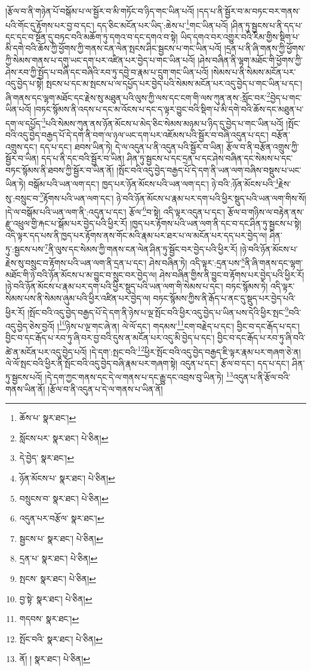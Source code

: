 །རྩོལ་བ་ནི་གཉེན་པོ་བསྒོམ་པ་ལ་སྦྱོར་བ་མི་གཏོང་བ་ཉིད་གང་ཡིན་པའོ། །དད་པ་ནི་སྦྱོར་བ་མ་བཏང་བར་གནས་པའི་གོང་དུ་རྟོགས་པར་བྱ་བ་དང་། དད་ཅིང་མངོན་པར་ཡིད་:ཆེས་པ་\footnote{ཆོས་པ་  སྣར་ཐང་། }གང་ཡིན་པའོ། །ཤིན་ཏུ་སྦྱངས་པ་ནི་དད་པ་དང་དང་བ་སྔོན་དུ་བཏང་བའི་མཆོག་ཏུ་དགའ་བ་དང་དགའ་བ་སྟེ། ཡིད་དགའ་བར་འགྱུར་བའི་རིམ་གྱིས་སྡིག་པ་མི་དགེ་བའི་ཆོས་ཀྱི་ཕྱོགས་ཀྱི་གནས་ངན་ལེན་སྤངས་ཤིང་སྦྱངས་པ་གང་ཡིན་པའོ། །དྲན་པ་ནི་ཞི་གནས་ཀྱི་ཕྱོགས་ཀྱི་སེམས་གནས་པ་དགུ་ཡང་དག་པར་འཛིན་པར་བྱེད་པ་གང་ཡིན་པའོ། །ཤེས་བཞིན་ནི་ལྷག་མཐོང་གི་ཕྱོགས་ཀྱི་ཤེས་རབ་ཀྱི་སྤྱོད་པ་བཞི་དང་བཞིའི་རབ་ཏུ་དབྱེ་བ་རྣམ་པ་དྲུག་གང་ཡིན་པའོ། །སེམས་པ་ནི་སེམས་མངོན་པར་འདུ་བྱེད་པ་སྟེ། སྤངས་པ་དང་མ་སྤངས་པ་ལ་དཔྱོད་པར་བྱེད་པའི་སེམས་མངོན་པར་འདུ་བྱེད་པ་གང་ཡིན་པ་དང་། ཞི་གནས་དང་ལྷག་མཐོང་དང་རྗེས་སུ་མཐུན་པའི་ལུས་ཀྱི་ལས་དང་ངག་གི་ལས་ཀུན་ནས་:སློང་བར་\footnote{སློངས་པར་  སྣར་ཐང་།  པེ་ཅིན། }བྱེད་པ་གང་ཡིན་པའོ། །བཏང་སྙོམས་ནི་འདས་པ་དང་མ་འོངས་པ་དང་ད་ལྟར་བྱུང་བའི་སྡིག་པ་མི་དགེ་བའི་ཆོས་དང་མཐུན་པ་དག་ལ་དཔྱོད་\footnote{དེ་བྱེད་  སྣར་ཐང་། }པའི་སེམས་ཀུན་ནས་ཉོན་མོངས་པ་མེད་ཅིང་སེམས་མཉམ་པ་ཉིད་དུ་བྱེད་པ་གང་ཡིན་པའོ། །སྤོང་བའི་འདུ་བྱེད་བརྒྱད་པོ་དེ་དག་ནི་བག་ལ་ཉལ་ཡང་དག་པར་འཇོམས་པའི་སྦྱོར་བ་བཞི་འདུན་པ་དང་། བརྩོན་འགྲུས་དང་། དད་པ་དང་། ཐབས་ཡིན་ཏེ། དེ་ལ་འདུན་པ་ནི་འདུན་པའི་སྦྱོར་བ་ཡིན། རྩོལ་བ་ནི་བརྩོན་འགྲུས་ཀྱི་སྦྱོར་བ་ཡིན། དད་པ་ནི་དང་བའི་སྦྱོར་བ་ཡིན། ཤིན་ཏུ་སྦྱངས་པ་དང་དྲན་པ་དང་ཤེས་བཞིན་དང་སེམས་པ་དང་བཏང་སྙོམས་ནི་ཐབས་ཀྱི་སྦྱོར་བ་ཡིན་ནོ། །སྤོང་བའི་འདུ་བྱེད་བརྒྱད་པོ་དེ་དག་ནི་ཡན་ལག་བཞིས་བསྡུས་པ་ཡང་ཡིན་ཏེ། བསྒོམ་པའི་ཡན་ལག་དང་། ཁྱད་པར་ཉོན་མོངས་པའི་ཡན་ལག་དང་། ཉེ་བའི་:ཉོན་མོངས་པའི་\footnote{ཉོན་མོངས་པ་  སྣར་ཐང་།  པེ་ཅིན། }རྗེས་སུ་:བསྲུང་བ་\footnote{བསྲུངས་བ་  སྣར་ཐང་།  པེ་ཅིན། }རྟོགས་པའི་ཡན་ལག་དང་། ཉེ་བའི་ཉོན་མོངས་པ་རྣམ་པར་དག་པའི་ཕྱིར་སྡུད་པའི་ཡན་ལག་གིས་སོ། །དེ་ལ་བསྒོམ་པའི་ཡན་ལག་ནི་:འདུན་པ་དང་། རྩོལ་\footnote{འདུན་པར་བརྩོལ་  སྣར་ཐང་། }བ་སྟེ། འདི་ལྟར་འདུན་པ་དང་། རྩོལ་བ་གཉིས་ལ་བརྟེན་ནས་རྫུ་འཕྲུལ་གྱི་རྐང་པ་སྒོམ་པར་བྱེད་པའི་ཕྱིར་རོ། །ཁྱད་པར་རྟོགས་པའི་ཡན་ལག་ནི་དང་བ་དང་ཤིན་ཏུ་སྦྱངས་པ་སྟེ། འདི་ལྟར་དད་པས་ནི་ཁྱད་པར་རྟོགས་ནས་གོང་མའི་རྣམ་པར་ཐར་པ་ལ་མངོན་པར་དད་པར་བྱེད་ལ། ཤིན་ཏུ་:སྦྱངས་པས་\footnote{སྦྱངས་པ་  སྣར་ཐང་།  པེ་ཅིན། }ནི་ལུས་དང་སེམས་ཀྱི་གནས་ངན་ལེན་ཤིན་ཏུ་སྦྱོང་བར་བྱེད་པའི་ཕྱིར་རོ། །ཉེ་བའི་ཉོན་མོངས་པ་རྗེས་སུ་བསྲུང་བ་རྟོགས་པའི་ཡན་ལག་ནི་དྲན་པ་དང་། ཤེས་བཞིན་ཏེ། འདི་ལྟར་:དྲན་པས་\footnote{དྲན་པ་  སྣར་ཐང་།  པེ་ཅིན། }ནི་ཞི་གནས་དང་ལྷག་མཐོང་གི་ཉེ་བའི་ཉོན་མོངས་པ་མ་བྱུང་བ་སྲུང་བར་བྱེད་ལ། ཤེས་བཞིན་གྱིས་ནི་བྱུང་བ་རྟོགས་པར་བྱེད་པའི་ཕྱིར་རོ། །ཉེ་བའི་ཉོན་མོངས་པ་རྣམ་པར་དག་པའི་ཕྱིར་སྡུད་པའི་ཡན་ལག་གི་སེམས་པ་དང་། བཏང་སྙོམས་ཏེ། འདི་ལྟར་སེམས་པས་ནི་སེམས་ཞུམ་པའི་ཕྱིར་འཛིན་པར་བྱེད་ལ། བཏང་སྙོམས་ཀྱིས་ནི་རྒོད་པ་ནང་དུ་སྡུད་པར་བྱེད་པའི་ཕྱིར་རོ། །སྤོང་བའི་འདུ་བྱེད་བརྒྱད་པོ་དེ་དག་ནི་ཉེས་པ་ལྔ་སྤོང་བའི་ཕྱིར་འདུ་བྱེད་པ་ཡིན་པས་དེའི་ཕྱིར་སྤང་\footnote{སྤངས་  སྣར་ཐང་།  པེ་ཅིན། }བའི་འདུ་བྱེད་ཅེས་བྱའོ། །\footnote{བྱ་སྟེ་  སྣར་ཐང་།  པེ་ཅིན། }ཉེས་པ་ལྔ་གང་ཞེ་ན། ལེ་ལོ་དང་། གདམས་\footnote{གདབས་  སྣར་ཐང་། }ངག་བརྗེད་པ་དང་། བྱིང་བ་དང་རྒོད་པ་དང་། བྱིང་བ་དང་རྒོད་པ་རབ་ཏུ་ཞི་བར་བྱ་བའི་དུས་ན་མངོན་པར་འདུ་མི་བྱེད་པ་དང་། བྱིང་བ་དང་རྒོད་པ་རབ་ཏུ་ཞི་བའི་ཚེ་ན་མངོན་པར་འདུ་བྱེད་པའོ། །དེ་དག་:སྤང་བའི་\footnote{སྤོང་བའི་  སྣར་ཐང་།  པེ་ཅིན། }ཕྱིར་སྤོང་བའི་འདུ་བྱེད་བརྒྱད་ཇི་ལྟར་རྣམ་པར་གཞག་ཅེ་ན། ལེ་ལོ་སྤང་བའི་ཕྱིར་ནི་སྤོང་བའི་འདུ་བྱེད་བཞི་རྣམ་པར་གཞག་སྟེ། འདུན་པ་དང་། རྩོལ་བ་དང་། དད་པ་དང་། ཤིན་ཏུ་སྦྱངས་པའོ། །དེ་དག་ཀྱང་གནས་དང་དེ་ལ་གནས་པ་དང་རྒྱུ་དང་འབྲས་བུ་ཡིན་ཏེ། \footnote{ནོ། །   སྣར་ཐང་།  པེ་ཅིན། }འདུན་པ་ནི་རྩོལ་བའི་གནས་ཡིན་ནོ། །རྩོལ་བ་ནི་འདུན་པ་དེ་ལ་གནས་པ་ཡིན་ནོ། 